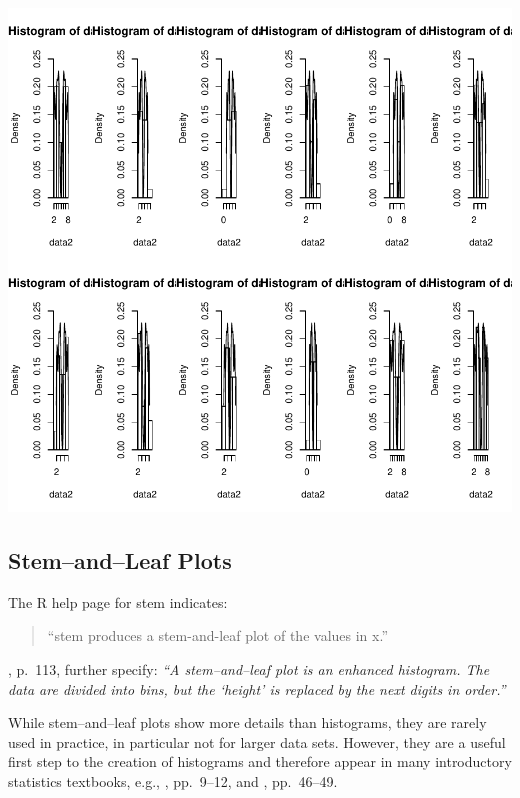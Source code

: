 \documentclass[12pt,letterpaper,final]{article}
\begin{document}
\includegraphics{lect_main-008}


\newpage


\subsection{Stem--and--Leaf Plots}


The R help page for stem indicates:
\begin{quotation}
``stem produces a stem-and-leaf plot of the values in x.''
\end{quotation}


\cite{VR2002}, p.~113, further specify: 
{\it ``A stem--and--leaf plot is an enhanced histogram. The data are
divided into bins, but the `height' is replaced by the next digits in order.''}

While stem--and--leaf plots show more details than histograms, they are rarely used
in practice, in particular not for larger data sets. However, they are a useful first step
to the creation of histograms and therefore appear in many introductory statistics
textbooks, e.g.,
\cite{MMC2012}, pp.~9--12, and
\cite{Bla1998}, pp.~46--49.
\end{document}
